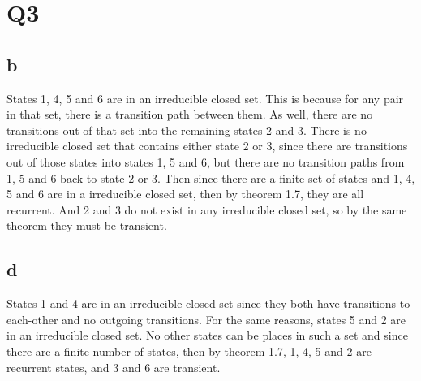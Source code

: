 \documentclass{article}
\begin{document}
\section*{Q3}
\subsection*{b}
States 1, 4, 5 and 6 are in an irreducible closed set. This is because for any pair in that set, there is a transition path between them. As well, there are no transitions out of that set into the remaining states 2 and 3. There is no irreducible closed set that contains either state 2 or 3, since there are transitions out of those states into states 1, 5 and 6, but there are no transition paths from 1, 5 and 6 back to state 2 or 3. Then since there are a finite set of states and 1, 4, 5 and 6 are in a irreducible closed set, then by theorem 1.7, they are all recurrent. And 2 and 3 do not exist in any irreducible closed set, so by the same theorem they must be transient.

\subsection*{d}
States 1 and 4 are in an irreducible closed set since they both have transitions to each-other and no outgoing transitions. For the same reasons, states 5 and 2 are in an irreducible closed set. No other states can be places in such a set and since there are a finite number of states, then by theorem 1.7, 1, 4, 5 and 2 are recurrent states, and 3 and 6 are transient.  
\end{document}
